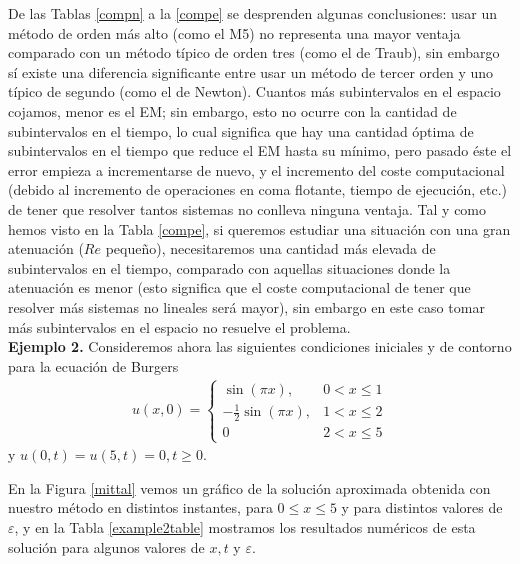 De las Tablas \ref{compn} a la \ref{compe} se desprenden algunas conclusiones: usar un método de orden más alto (como el M5) no representa una mayor ventaja comparado con un método típico de orden tres (como el de Traub), sin embargo sí existe una diferencia significante entre usar un método de tercer orden y uno típico de segundo (como el de Newton). Cuantos más subintervalos en el espacio cojamos, menor es el EM; sin embargo, esto no ocurre con la cantidad de subintervalos en el tiempo, lo cual significa que hay una cantidad óptima de subintervalos en el tiempo que reduce el EM hasta su mínimo, pero pasado éste el error empieza a incrementarse de nuevo, y el incremento del coste computacional (debido al incremento de operaciones en coma flotante, tiempo de ejecución, etc.) de tener que resolver tantos sistemas no conlleva ninguna ventaja. Tal y como hemos visto en la Tabla \ref{compe}, si queremos estudiar una situación con una gran atenuación ($Re$ pequeño), necesitaremos una cantidad más elevada de subintervalos en el tiempo, comparado con aquellas situaciones donde la atenuación es menor (esto significa que el coste computacional de tener que resolver más sistemas no lineales será mayor), sin embargo en este caso tomar más subintervalos en el espacio no resuelve el problema.
\vspace{0.5 cm} \\
\textbf{Ejemplo 2.} Consideremos ahora las siguientes condiciones iniciales y de contorno para la ecuación de Burgers
\begin{eqnarray}
u(x,0)=\left\{ \begin{array} {ll}
\sin(\pi x),             & 0< x \leq 1 \\
-\frac{1}{2}\sin(\pi x), & 1< x \leq 2 \\
0& 2< x\leq 5
\end{array} \right.
\end{eqnarray}
y $u(0,t)=u(5,t)=0, t\ge 0$.
\vspace{0.25 cm}

En la Figura \ref{mittal} vemos un gráfico de la solución aproximada obtenida con nuestro método en distintos instantes, para $0\leq x\leq 5$ y para distintos valores de  $\varepsilon$, y en la Tabla \ref{example2table} mostramos los resultados numéricos de esta solución para algunos valores de $x, t$ y $\varepsilon$.

